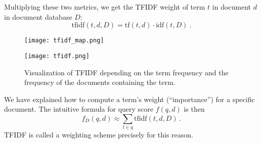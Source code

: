 Multiplying these two metrics, we get the TFIDF weight of term $t$ in document $d$ in document database $D$:
\begin{equation}
        \text{tfidf}(t,d,D)=\text{tf}(t,d)\cdot\text{idf}(t,D)\ .
\end{equation}

\begin{figure}[!htb]
	\centering
	\begin{minipage}{.5\textwidth}
		\centering
		\texttt{[image: tfidf\_map.png]}
	\end{minipage}%
	\begin{minipage}{.5\textwidth}
		\centering
		\texttt{[image: tfidf.png]}
	\end{minipage}
        \caption[Visualization of TFIDF]{Visualization of TFIDF depending on the term frequency and the frequency of the documents containing the term.}
\end{figure}

We have explained how to compute a term's weight (``importance'') for a specific document.
The intuitive formula for query score $f(q, d)$ is then
\begin{equation}
        f_D(q, d)\approx\sum_{t \in q}\text{tfidf}(t, d, D)\ .
\end{equation}
TFIDF is called a weighting scheme precisely for this reason.

